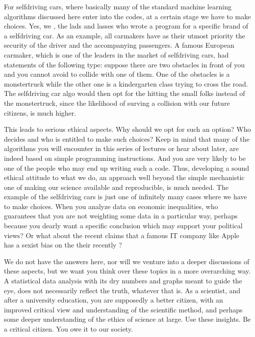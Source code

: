 \documentclass[letterpaper,10pt,english]{sphinxmanual}
\begin{document}
For self\sphinxhyphen{}driving cars, where basically many of the standard machine
learning algorithms discussed here enter into the codes, at a certain
stage we have to make choices. Yes, we , the lads and lasses who wrote
a program for a specific brand of a self\sphinxhyphen{}driving car.  As an example,
all carmakers have as their utmost priority the security of the
driver and the accompanying passengers. A famous European carmaker, which is
one of the leaders in the market of self\sphinxhyphen{}driving cars, had 
statements of the following type: suppose there are two obstacles in
front of you and you cannot avoid to collide with one of them. One of
the obstacles is a monstertruck while the other one is a kindergarten
class trying to cross the road. The self\sphinxhyphen{}driving car algo would then
opt for the hitting the small folks instead of the monstertruck, since
the likelihood of surving a collision with our future citizens, is
much higher.

This leads to serious ethical aspects. Why should we opt for such an
option? Who decides and who is entitled to make such choices? Keep in
mind that many of the algorithms you will encounter in this series of
lectures or hear about later, are indeed based on simple programming
instructions. And you are very likely to be one of the people who may
end up writing such a code. Thus, developing a sound ethical attitude
to what we do, an approach well beyond the simple mechanistic one of
making our science available and reproducible, is much needed. The
example of the self\sphinxhyphen{}driving cars is just one of infinitely many cases
where we have to make choices. When you analyze data on economic
inequalities, who guarantees that you are not weighting some data in a
particular way, perhaps because you dearly want a specific conclusion
which may support your political views? Or what about the recent
claims that a famous IT company like Apple has a sexist bias on the
their recently ?

We do not have the answers here, nor will we venture into a deeper
discussions of these aspects, but we want you think over these topics
in a more overarching way.  A statistical data analysis with its dry
numbers and graphs meant to guide the eye, does not necessarily
reflect the truth, whatever that is.  As a scientist, and after a
university education, you are supposedly a better citizen, with an
improved critical view and understanding of the scientific method, and
perhaps some deeper understanding of the ethics of science at
large. Use these insights. Be a critical citizen. You owe it to our
society.
\end{document}

